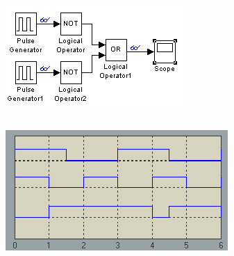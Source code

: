 \documentclass[10pt]{article}
\begin{document}
  \subsection{}
   \begin{center}
    \includegraphics{6b}
   \end{center}
  \subsection{}
   \begin{center}
    \includegraphics{6c}
   \end{center}
\end{document}
